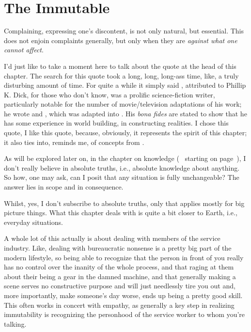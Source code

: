 \documentclass[../butidigress.tex]{subfiles}
\begin{document}
\chapter{The Immutable}\label{chap:immutable}
\newpage
{}
Complaining, expressing one's discontent, is not only natural, but essential.
This does not enjoin complaints generally, but only when they are \emph{against what one cannot affect}.

I'd just like to take a moment here to talk about the quote at the head of this chapter.
The search for this quote took a long, long, long-ass time, like, a truly disturbing amount of time.
For quite a while it simply said , attributed to 
Phillip K. Dick, for those who don't know, was a prolific science-fiction writer, particularly notable for the number of movie/television adaptations of his work; he wrote  and , which was adapted into .
His \textit{bona fides} are stated to show that he has some experience in world building, in constructing realities.
I chose this quote, I like this quote, because, obviously, it represents the spirit of this chapter; it also ties into, reminds me, of concepts from .

As will be explored later on, in the chapter on knowledge (~ starting on page~\pageref{chap:knowledge}), I don't really believe in absolute truths, i.e., absolute knowledge about anything.
So how, one may ask, can I posit that any situation is fully unchangeable?
The answer lies in scope and in consequence.

Whilst, yes, I don't subscribe to absolute truths, only  that applies mostly for big picture things.
What this chapter deals with is quite a bit closer to Earth, i.e., everyday situations.

A whole lot of this actually is about dealing with members of the service industry.
Like, dealing with bureaucratic nonsense is a pretty big part of the modern lifestyle, so being able to recognize that the person in front of you really has no control over the inanity of the whole process, and that raging at them about their being a gear in the damned machine, and that generally making a scene serves no constructive purpose and will just needlessly tire you out and, more importantly, make someone's day worse, ends up being a pretty good skill.
This often works in concert with empathy, as generally a key step in realizing immutability is recognizing the personhood of the service worker to whom you're talking.
\end{document}
